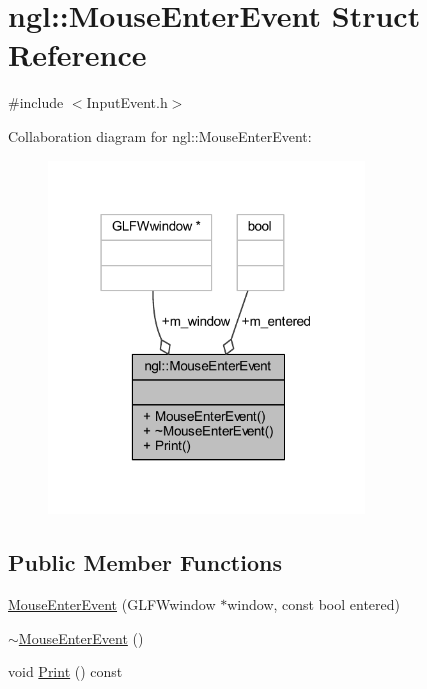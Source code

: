 \hypertarget{structngl_1_1_mouse_enter_event}{}\section{ngl\+:\+:Mouse\+Enter\+Event Struct Reference}
\label{structngl_1_1_mouse_enter_event}


{\ttfamily \#include $<$Input\+Event.\+h$>$}



Collaboration diagram for ngl\+:\+:Mouse\+Enter\+Event\+:
\nopagebreak
\begin{figure}[H]
\begin{center}
\leavevmode
\includegraphics[width=238pt]{structngl_1_1_mouse_enter_event__coll__graph}
\end{center}
\end{figure}
\subsection*{Public Member Functions}
\begin{DoxyCompactItemize}
\item 
\mbox{\hyperlink{structngl_1_1_mouse_enter_event_ad05521e030866d3d036662f2938d8b54}{Mouse\+Enter\+Event}} (G\+L\+F\+Wwindow $\ast$window, const bool entered)
\item 
\mbox{\hyperlink{structngl_1_1_mouse_enter_event_a204bbe3eb5bdf812f06f317ba0cdb411}{$\sim$\+Mouse\+Enter\+Event}} ()
\item 
void \mbox{\hyperlink{structngl_1_1_mouse_enter_event_abc7fedebbc99bc6294d89e69a259557f}{Print}} () const
\end{DoxyCompactItemize}
